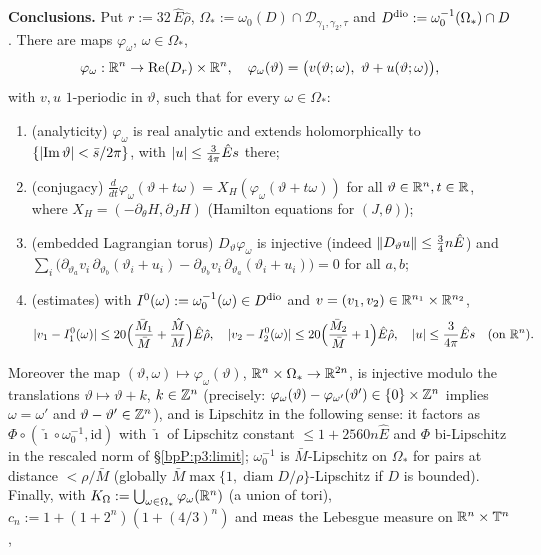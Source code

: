 \begin{proposition}
\textbf{Conclusions.} Put $r:=32\,\hat E\hat\rho$, $\Omega_*:=\omega_0(D)\cap\mathcal D_{\gamma_1,\gamma_2,\tau}$ and $D^{\rm dio}:=\omega_0^{-1}(\Omega_*)\cap D$. There are maps $\varphi_\omega$, $\omega\in\Omega_*$,
\[\varphi_\omega:\R^n\to\operatorname{Re}(D_r)\times\R^n,\quad\varphi_\omega(\vartheta)=\bigl(v(\vartheta;\omega),\ \vartheta+u(\vartheta;\omega)\bigr),\]
with $v,u$ $1$-periodic in $\vartheta$, such that for every $\omega\in\Omega_*$:
\begin{enumerate}[label=(\alph*)]
\item (analyticity) $\varphi_\omega$ is real analytic and extends holomorphically to $\{\lvert \operatorname{Im}\vartheta\rvert<\bar s/2\pi\}$, with $\lvert u\rvert\le\frac{3}{4\pi}\hat Es$ there;
\item (conjugacy) $\frac{d}{dt}\varphi_\omega(\vartheta+t\omega)=X_H(\varphi_\omega(\vartheta+t\omega))$ for all $\vartheta\in\mathbb{R}^n,t\in\mathbb{R}$, where $X_H=(-\partial_\theta H,\partial_JH)$ (Hamilton equations for $(J,\theta)$);
\item (embedded Lagrangian torus) $D_\vartheta\varphi_\omega$ is injective (indeed $\lVert D_\vartheta u\rVert\le\frac34n\hat E$) and $\sum_i\bigl(\partial_{\vartheta_a}v_i\,\partial_{\vartheta_b}(\vartheta_i+u_i)-\partial_{\vartheta_b}v_i\,\partial_{\vartheta_a}(\vartheta_i+u_i)\bigr)=0$ for all $a,b$;
\item (estimates) with $I^0(\omega):=\omega_0^{-1}(\omega)\in D^{\rm dio}$ and $v=(v_1,v_2)\in\mathbb{R}^{n_1}\times\mathbb{R}^{n_2}$,
\[\lvert v_1-I^0_1(\omega)\rvert\le20\Bigl(\frac{\bar M_1}{\bar M}+\frac{\hat M}M\Bigr)\hat E\hat\rho,\quad
\lvert v_2-I^0_2(\omega)\rvert\le20\Bigl(\frac{\bar M_2}{\bar M}+1\Bigr)\hat E\hat\rho,\quad\lvert u\rvert\le\frac3{4\pi}\hat Es\quad(\text{on }\mathbb{R}^n).\]
\end{enumerate}
Moreover the map $(\vartheta,\omega)\mapsto\varphi_\omega(\vartheta)$, $\mathbb{R}^n\times\Omega_*\to\mathbb{R}^{2n}$, is injective modulo the translations $\vartheta\mapsto\vartheta+k$, $k\in\mathbb{Z}^n$ (precisely: $\varphi_\omega(\vartheta)-\varphi_{\omega'}(\vartheta')\in\{0\}\times\mathbb{Z}^n$ implies $\omega=\omega'$ and $\vartheta-\vartheta'\in\mathbb{Z}^n$), and is Lipschitz in the following sense: it factors as $\Phi\circ(\check\imath\circ\omega_0^{-1},\mathrm{id})$ with $\check\imath$ of Lipschitz constant $\le1+2560n\hat E$ and $\Phi$ bi-Lipschitz in the rescaled norm of \S\ref{bpP:p3:limit}; $\omega_0^{-1}$ is $\bar M$-Lipschitz on $\Omega_*$ for pairs at distance $<\rho/\bar M$ (globally $\bar M\max\{1,\operatorname{diam}D/\rho\}$-Lipschitz if $D$ is bounded).
Finally, with $K_\Omega:=\bigcup_{\omega\in\Omega_*}\varphi_\omega(\mathbb{R}^n)$ (a union of tori), $c_n:=1+(1+2^n)(1+(4/3)^n)$ and $\operatorname{meas}$ the Lebesgue measure on $\mathbb{R}^n\times\mathbb{T}^n$,

\end{proposition}
